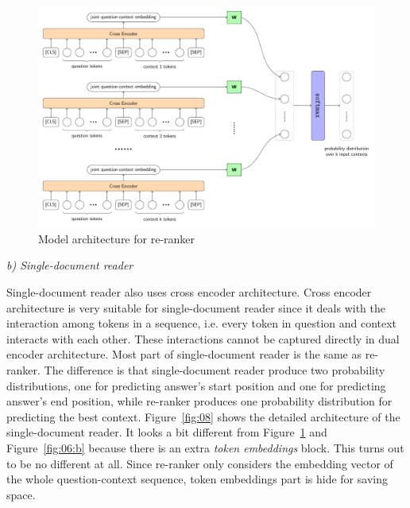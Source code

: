 \documentclass[12pt, sort&compress]{report}
\begin{document}
\begin{figure}[!htbp]
	\centering
	\includegraphics[scale=.6]{images/PDF/full-reranker/fullRerank.pdf}	
	\caption{Model architecture for re-ranker}
	\label{fig:07}
\end{figure}
\par \textit{b) Single-document reader}
\par Single-document reader also uses cross encoder architecture. Cross encoder architecture is very suitable for single-document reader since it deals with the interaction among tokens in a sequence, i.e. every token in question and context interacts with each other. These interactions cannot be captured directly in dual encoder architecture. Most part of single-document reader is the same as re-ranker. The difference is that single-document reader produce two probability distributions, one for predicting answer's start position and one for predicting answer's end position, while re-ranker produces one probability distribution for predicting the best context. Figure~\ref{fig:08} shows the detailed architecture of the single-document reader. It looks a bit different from Figure~\ref{fig:07} and Figure~\ref{fig:06:b} because there is an extra \textit{token embeddings} block. This turns out to be no different at all. Since re-ranker only considers the embedding vector of the whole question-context sequence, token embeddings part is hide for saving space.
\end{document}
